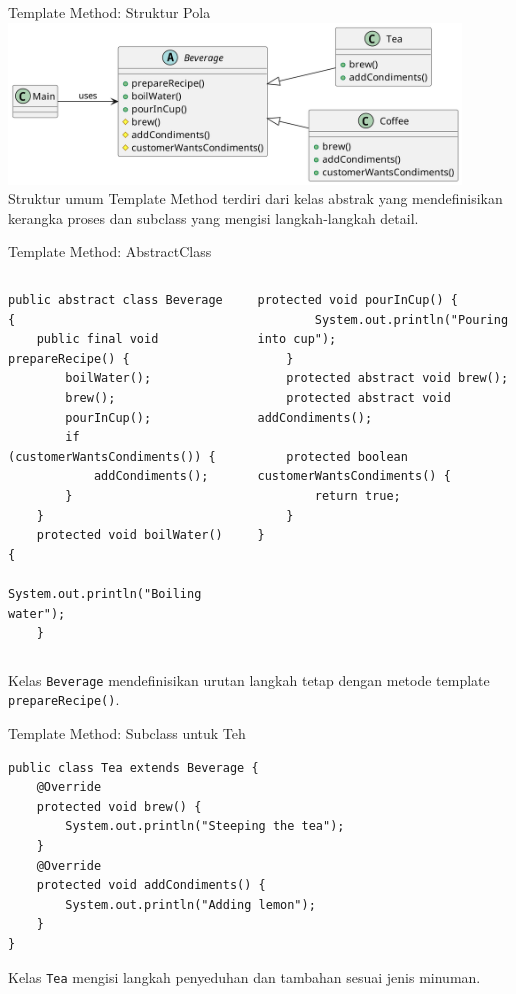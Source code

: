 \documentclass[aspectratio=169, table]{beamer}
\begin{document}
\begin{frame}[fragile]{Template Method: Struktur Pola}
	\vspace{20pt}
\centering
\includegraphics[width=0.9\textwidth]{../../figures/out/template_method.png}
\vspace{6pt}
\small Struktur umum Template Method terdiri dari kelas abstrak yang mendefinisikan kerangka proses dan subclass yang mengisi langkah-langkah detail.
\end{frame}

\begin{frame}[fragile]{Template Method: AbstractClass}
\begin{columns}[t]
\begin{lstlisting}[style=JavaStyle]
public abstract class Beverage {
	public final void prepareRecipe() {
		boilWater();
		brew();
		pourInCup();
		if (customerWantsCondiments()) {
			addCondiments();
		}
	}
	protected void boilWater() {
		System.out.println("Boiling water");
	}
\end{lstlisting}

\begin{lstlisting}[style=JavaStyle]
	protected void pourInCup() {
		System.out.println("Pouring into cup");
	}
	protected abstract void brew();
	protected abstract void addCondiments();
	
	protected boolean customerWantsCondiments() {
		return true;
	}
}
\end{lstlisting}
\end{columns}

\vspace{4pt}
	\small Kelas \texttt{Beverage} mendefinisikan urutan langkah tetap dengan metode template \texttt{prepareRecipe()}.
\end{frame}


\begin{frame}[fragile]{Template Method: Subclass untuk Teh}
\begin{lstlisting}[style=JavaStyle]
public class Tea extends Beverage {
	@Override
	protected void brew() {
		System.out.println("Steeping the tea");
	}
	@Override
	protected void addCondiments() {
		System.out.println("Adding lemon");
	}
}
\end{lstlisting}
\vspace{4pt}
\small Kelas \texttt{Tea} mengisi langkah penyeduhan dan tambahan sesuai jenis minuman.
\end{frame}
\end{document}

